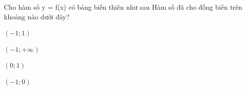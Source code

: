 \begin{question}[type=multiple_choice,difficulty=1,code={I-2}]
Cho hàm số y = f(x) có bảng biến thiên như sau
Hàm số đã cho đồng biến trên khoảng nào dưới đây?



\begin{choice}[label=A]
$ (-1;1) $
\end{choice}

\begin{choice}[label=B]
$ (-1;+\infty) $
\end{choice}

\begin{choice}[correct,label=C]
$ (0;1) $
\end{choice}

\begin{choice}[label=D]
$ (-1;0) $
\end{choice}

\end{question}